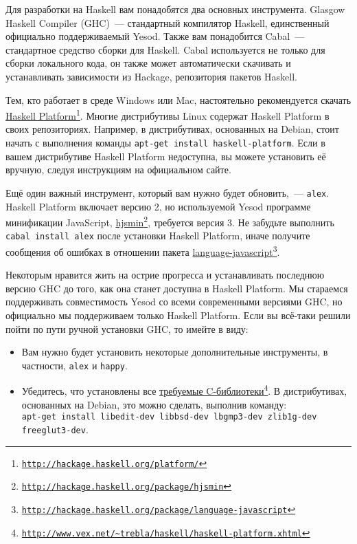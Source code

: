 Для разработки на Haskell вам понадобятся два основных инструмента. Glasgow Haskell Compiler (GHC)~--- стандартный компилятор Haskell, единственный официально поддерживаемый Yesod. Также вам понадобится Cabal~--- стандартное средство сборки для Haskell. Cabal используется не только для сборки локального кода, он также может автоматически скачивать и устанавливать зависимости из Hackage, репозитория пакетов Haskell.

Тем, кто работает в среде Windows или Mac, настоятельно рекомендуется скачать \href{http://hackage.haskell.org/platform/}{Haskell Platform}\footnote{\href{http://hackage.haskell.org/platform/}{\texttt{http://hackage.haskell.org/platform/}}}. Многие дистрибутивы Linux содержат Haskell Platform в своих репозиториях. Например, в дистрибутивах, основанных на Debian, стоит начать с выполнения команды \texttt{apt-get install haskell-platform}. Если в вашем дистрибутиве Haskell Platform недоступна, вы можете установить её вручную, следуя инструкциям на официальном сайте.

Ещё один важный инструмент, который вам нужно будет обновить,~--- \texttt{alex}. Haskell Platform включает версию 2, но используемой Yesod программе минификации JavaScript, \href{http://hackage.haskell.org/package/hjsmin}{hjsmin}\footnote{\href{http://hackage.haskell.org/package/hjsmin}{\texttt{http://hackage.haskell.org/package/hjsmin}}}, требуется версия 3. Не забудьте выполнить \texttt{cabal install alex} после установки Haskell Platform, иначе получите сообщения об ошибках в отношении пакета \href{http://hackage.haskell.org/package/language-javascript}{language-javascript}\footnote{\href{http://hackage.haskell.org/package/language-javascript}{\texttt{http://hackage.haskell.org/package/language-javascript}}}.

\begin{remark}
Некоторым нравится жить на острие прогресса и устанавливать последнюю версию GHC до того, как она станет доступна в Haskell Platform. Мы стараемся поддерживать совместимость Yesod со всеми современными версиями GHC, но официально мы поддерживаем только Haskell Platform. Если вы всё-таки решили пойти по пути ручной установки GHC, то имейте в виду:

\begin{itemize}
  \item Вам нужно будет установить некоторые дополнительные инструменты, в частности, \texttt{alex} и \texttt{happy}.
  \item Убедитесь, что установлены все \href{http://www.vex.net/~trebla/haskell/haskell-platform.xhtml}{требуемые C-библиотеки}\footnote{\href{http://www.vex.net/~trebla/haskell/haskell-platform.xhtml}{\texttt{http://www.vex.net/\~{}trebla/haskell/haskell-platform.xhtml}}}. В дистрибутивах, основанных на Debian, это можно сделать, выполнив команду:\\
 \texttt{apt-get install libedit-dev libbsd-dev lbgmp3-dev zlib1g-dev freeglut3-dev}.
\end{itemize}
\end{remark}

